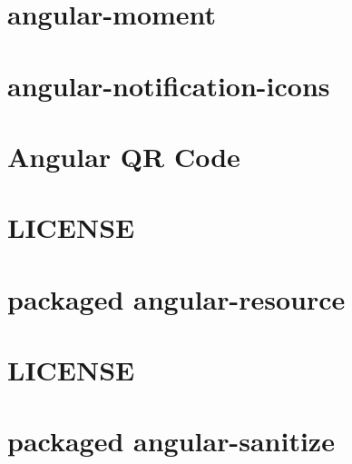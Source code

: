\documentclass[twoside]{book}
\newcommand{\+}{\discretionary{\mbox{\scriptsize$\hookleftarrow$}}{}{}}
\begin{document}
\chapter{angular-\/moment}
\label{md_app_web_bower_components_angular-moment__r_e_a_d_m_e}

\chapter{angular-\/notification-\/icons}
\label{md_app_web_bower_components_angular-notification-icons__r_e_a_d_m_e}

\chapter{Angular QR Code}
\label{md_app_web_bower_components_angular-qrcode__r_e_a_d_m_e}

\chapter{L\+I\+C\+E\+N\+SE}
\label{md_app_web_bower_components_angular-resource__l_i_c_e_n_s_e}

\chapter{packaged angular-\/resource}
\label{md_app_web_bower_components_angular-resource__r_e_a_d_m_e}

\chapter{L\+I\+C\+E\+N\+SE}
\label{md_app_web_bower_components_angular-sanitize__l_i_c_e_n_s_e}

\chapter{packaged angular-\/sanitize}
\label{md_app_web_bower_components_angular-sanitize__r_e_a_d_m_e}

\end{document}
